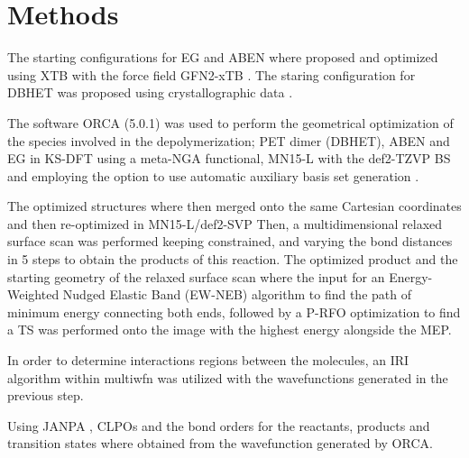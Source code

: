 \section{Methods}

The starting configurations for EG and ABEN where proposed and optimized using XTB \cite{Bannwarth2021} with the force field GFN2-xTB \cite{Bannwarth2019}. The staring configuration for DBHET was proposed using crystallographic data \cite{Daubeny1954}. 

The software ORCA (5.0.1) \cite{Neese2020} was used to perform the geometrical optimization of the species involved in the depolymerization; PET dimer (DBHET), ABEN and EG in KS-DFT using a meta-NGA functional, MN15-L \cite{Yu2016} with the def2-TZVP BS and employing the option to use automatic auxiliary basis set generation \cite{Stoychev2017}.

The optimized structures where then merged onto the same Cartesian coordinates and then re-optimized in MN15-L/def2-SVP Then, a multidimensional relaxed surface scan was performed keeping constrained, and varying the bond distances in 5 steps to obtain the products of this reaction. The optimized product and the starting geometry of the relaxed surface scan where the input for an Energy-Weighted Nudged Elastic Band (EW-NEB)\cite{Asgeirsson2021} algorithm to find the path of minimum energy connecting both ends, followed by a P-RFO optimization to find a TS was performed onto the image with the highest energy alongside the MEP.

In order to determine interactions regions between the molecules, an IRI algorithm within multiwfn was utilized \cite{Lu2021} with the wavefunctions generated in the previous step. 

Using JANPA \cite{Nikolaienko2014}, CLPOs and the bond orders for the reactants, products and transition states where obtained from the wavefunction generated by ORCA. 